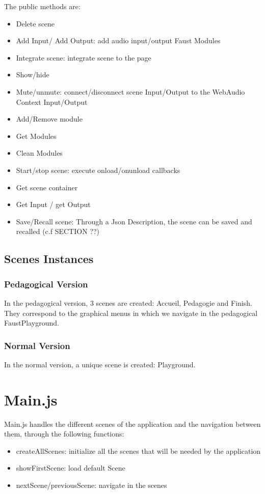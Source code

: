 \documentclass[a4paper]{article}
\begin{document}
The public methods are:
\begin{itemize}
\item Delete scene
\item Add Input/ Add Output: add audio input/output Faust Modules
\item Integrate scene: integrate scene to the page
\item Show/hide
\item Mute/unmute: connect/disconnect scene Input/Output to the WebAudio Context Input/Output
\item Add/Remove module
\item Get Modules
\item Clean Modules
\item Start/stop scene: execute onload/onunload callbacks
\item Get scene container
\item Get Input / get Output
\item Save/Recall scene: Through a Json Description, the scene can be saved and recalled (c.f SECTION ??)
\end{itemize}

\subsection{Scenes Instances}
\subsubsection{Pedagogical Version}
In the pedagogical version, 3 scenes are created: Accueil, Pedagogie and Finish.
They correspond to the graphical menus in which we navigate in the pedagogical FaustPlayground.

\subsubsection{Normal Version}
In the normal version, a unique scene is created: Playground.

\section{Main.js}

 Main.js handles the different scenes of the application and the navigation between them, through the following functions:
 \begin{itemize}
 \item createAllScenes: initialize all the scenes that will be needed by the application
 \item showFirstScene: load default Scene
 \item nextScene/previousScene: navigate in the scenes
\end{itemize}
\end{document}
